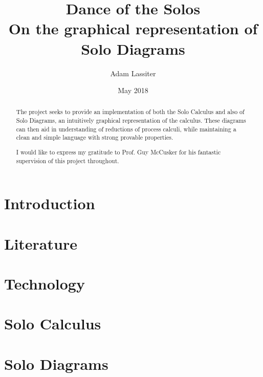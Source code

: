 \documentclass{article}
\title{Dance of the Solos \\
    \large On the graphical representation of Solo Diagrams}
\author{Adam Lassiter}
\date{May 2018}
\begin{document}
    
    \maketitle
    \vspace{\fill}
    \begin{abstract}
        The project seeks to provide an implementation of both the Solo Calculus and also of Solo Diagrams, an intuitively graphical representation of the calculus. These diagrams can then aid in understanding of reductions of process calculi, while maintaining a clean and simple language with strong provable properties.
    \end{abstract}
    \vspace{\fill}
    \pagebreak
    
    \renewcommand{\abstractname}{Acknowledgements}
    \null\vspace{\fill}
    \begin{abstract}
        I would like to express my gratitude to Prof. Guy McCusker for his fantastic supervision of this project throughout.
    \end{abstract}
    \vspace{\fill}
    \pagebreak
    
    \tableofcontents
    \pagebreak

    \section{Introduction}
        

    \section{Literature}
        
        
        
        
        

    \section{Technology}
        

    \section{Solo Calculus}
        

    \section{Solo Diagrams}
        
\end{document}
